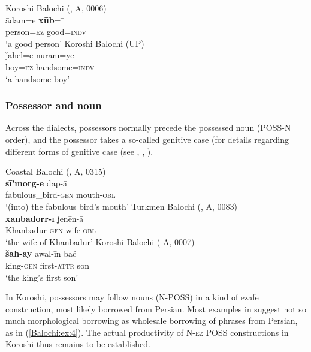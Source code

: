 \documentclass[output=paper,colorlinks,citecolor=brown,draftmode]{langscibook}
\begin{document}
\ea\label{Balochi:ex:2}
\ea\label{Balochi:ex:2a}
Koroshi Balochi (\citealt{nourzaei_balochi_koroshi_2021}, A, 0006)\\
\gll ādam=e \textbf{xūb}=ī \\
person=\textsc{ez} good=\textsc{indv} \\
\glt `a good person'
\ex\label{Balochi:ex:2b}
Koroshi Balochi (UP)\\
\gll ǰāhel=e nūrānī=ye \\
boy=\textsc{ez} handsome=\textsc{indv} \\
\glt `a handsome boy'
\z
\z

\subsubsection{Possessor and noun}\label{Balochi:ss:3.2.2}

Across the dialects, possessors normally precede the possessed noun ({POSS}-N order), and the possessor takes a so-called genitive case (for details regarding different forms of genitive case (see \citealt{nourzaei_participant_2017}, \citealt{nourzaei_koroshi_2015}, \citealt{korn_notes_2019}).

\ea\label{Balochi:ex:3}
\ea\label{Balochi:ex:3a}
Coastal Balochi (\citealt{nourzaei_balochi_coastal_2021}, A, 0315)\\
\gll \textbf{sī'morg-e} dap-ā \\
fabulous\_bird-\textsc{gen} mouth-\textsc{obl} \\
\glt `(into) the fabulous bird's mouth'
\ex\label{Balochi:ex:3b}
Turkmen Balochi (\citealt{haig_balochi_2022}, A, 0083)\\
\gll \textbf{xānbādorr-ī} ǰenēn-ā \\
Khanbadur-\textsc{gen} wife-\textsc{obl} \\
\glt `the wife of Khanbadur'
\ex\label{Balochi:ex:3c}
Koroshi Balochi (\citealt{nourzaei_balochi_koroshi_2021} A, 0007)\\
\gll \textbf{šāh-ay} awal-īn bač \\
king-\textsc{gen} first-\textsc{attr} son \\
\glt `the king's first son'
\z
\z


In Koroshi, possessors may follow nouns (N-{POSS}) in a kind of ezafe construction, most likely borrowed from Persian. Most examples in \citet{nourzaei_koroshi_2015} suggest not so much morphological borrowing as wholesale borrowing of phrases from Persian, as in (\ref{Balochi:ex:4}). The actual productivity of N-\textsc{ez} {POSS} constructions in Koroshi thus remains to be established. 
\end{document}
